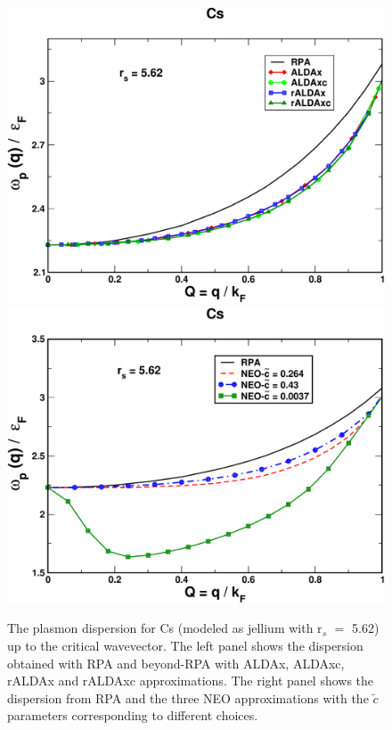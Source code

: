 \documentclass[aps,amsmath,amssymb, preprint, 12pt]{revtex4-1}
\begin{document}
\begin{figure}[h!]	
	\includegraphics[scale=0.3]{figure_4a.pdf}
	\includegraphics[scale=0.3]{figure_4b.pdf}
	\caption{The plasmon dispersion for Cs (modeled as jellium with r$_s$ $=$ 5.62) up to the critical wavevector. The left panel shows the dispersion obtained with RPA and beyond-RPA with ALDAx, ALDAxc, rALDAx and rALDAxc approximations. The right panel shows the dispersion from RPA and the three NEO approximations with the $\widetilde{c}$ parameters corresponding to different choices.}
	\label{fig3}
\end{figure}


\end{document}
